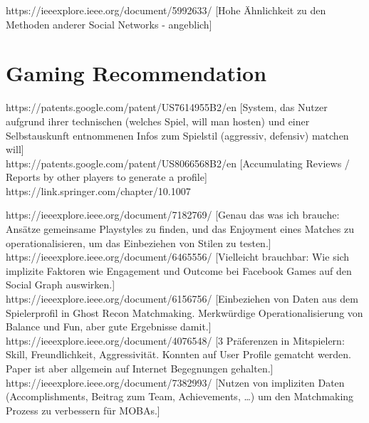 \documentclass[nochapterpage,bigchapter,linedtoc,longdoc,colorback,accentcolor=tud3b]{tudreport}
\begin{document}
https://ieeexplore.ieee.org/document/5992633/ [Hohe Ähnlichkeit zu den Methoden anderer Social Networks - angeblich]\\

\section{Gaming Recommendation}
https://patents.google.com/patent/US7614955B2/en [System, das Nutzer aufgrund ihrer technischen (welches Spiel, will man hosten) und einer Selbstauskunft entnommenen Infos zum Spielstil (aggressiv, defensiv) matchen will]\\

https://patents.google.com/patent/US8066568B2/en [Accumulating Reviews / Reports by other players to generate a profile]\\

https://link.springer.com/chapter/10.1007%

https://ieeexplore.ieee.org/document/7182769/ [Genau das was ich brauche: Ansätze gemeinsame Playstyles zu finden, und das Enjoyment eines Matches zu operationalisieren, um das Einbeziehen von Stilen zu testen.] \cite{wang2015thinking}\\

https://ieeexplore.ieee.org/document/6465556/ [Vielleicht brauchbar: Wie sich implizite Faktoren wie Engagement und Outcome bei Facebook Games auf den Social Graph auswirken.]\\

https://ieeexplore.ieee.org/document/6156756/ [Einbeziehen von Daten aus dem Spielerprofil in Ghost Recon Matchmaking. Merkwürdige Operationalisierung von Balance und Fun, aber gute Ergebnisse damit.] \cite{delalleau2012beyond}\\

https://ieeexplore.ieee.org/document/4076548/ [3 Präferenzen in Mitspielern: Skill, Freundlichkeit, Aggressivität. Konnten auf User Profile gematcht werden. Paper ist aber allgemein auf Internet Begegnungen gehalten.]\\

https://ieeexplore.ieee.org/document/7382993/ [Nutzen von impliziten Daten (Accomplishments, Beitrag zum Team, Achievements, …) um den Matchmaking Prozess zu verbessern für MOBAs.] \cite{suznjevic2015application}\\
\end{document}
